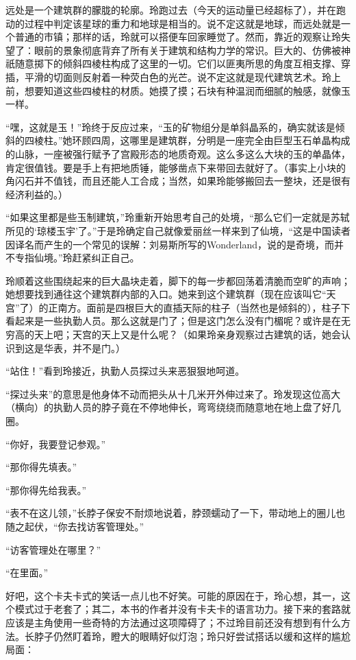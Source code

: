远处是一个建筑群的朦胧的轮廓。玲跑过去（今天的运动量已经超标了），并在跑动的过程中判定该星球的重力和地球是相当的。说不定这就是地球，而远处就是一个普通的市镇；那样的话，玲就可以搭便车回家睡觉了。然而，靠近的观察让玲失望了：眼前的景象彻底背弃了所有关于建筑和结构力学的常识。巨大的、仿佛被神祇随意掷下的倾斜四棱柱构成了这里的一切。它们以匪夷所思的角度互相支撑、穿插，平滑的切面则反射着一种荧白色的光芒。说不定这就是现代建筑艺术。玲上前，想要知道这些四棱柱的材质。她摸了摸；石块有种温润而细腻的触感，就像玉一样。

“嘿，这就是玉！”玲终于反应过来，“玉的矿物组分是单斜晶系的，确实就该是倾斜的四棱柱。”她环顾四周，这哪里是建筑群，分明是一座完全由巨型玉石单晶构成的山脉，一座被强行赋予了宫殿形态的地质奇观。这么多这么大块的玉的单晶体，肯定很值钱。要是手上有把地质锤，能够凿点下来带回去就好了。（事实上小块的角闪石并不值钱，而且还能人工合成；当然，如果玲能够搬回去一整块，还是很有经济利益的。）

“如果这里都是些玉制建筑，”玲重新开始思考自己的处境，“那么它们一定就是苏轼所见的‘琼楼玉宇’了。”于是玲确定自己就像爱丽丝一样来到了仙境，“这是中国读者因译名而产生的一个常见的误解：刘易斯所写的Wonderland，说的是奇境，而并不专指仙境。”玲赶紧纠正自己。

玲顺着这些围绕起来的巨大晶块走着，脚下的每一步都回荡着清脆而空旷的声响；她想要找到通往这个建筑群内部的入口。她来到这个建筑群（现在应该叫它“天宫”了）的正南方。面前是四根巨大的直插天际的柱子（当然也是倾斜的），柱子下看起来是一些执勤人员。那么这就是门了；但是这门怎么没有门楣呢？或许是在无穷高的天上吧；天宫的天上又是什么呢？（如果玲亲身观察过古建筑的话，她会认识到这是华表，并不是门。）

“站住！”看到玲接近，执勤人员探过头来恶狠狠地呵道。

“探过头来”的意思是他身体不动而把头从十几米开外伸过来了。玲发现这位高大（横向）的执勤人员的脖子竟在不停地伸长，弯弯绕绕而随意地在地上盘了好几圈。

“你好，我要登记参观。”

“那你得先填表。”

“那你得先给我表。”

“表不在这儿领，”长脖子保安不耐烦地说着，脖颈蠕动了一下，带动地上的圈儿也随之起伏，“你去找访客管理处。”

“访客管理处在哪里？”

“在里面。”

好吧，这个卡夫卡式的笑话一点儿也不好笑。可能的原因在于，玲心想，其一，这个模式过于老套了；其二，本书的作者并没有卡夫卡的语言功力。接下来的套路就应该是主角使用一些奇特的方法通过这项障碍了；不过玲目前还没有想到有什么方法。长脖子仍然盯着玲，瞪大的眼睛好似灯泡；玲只好尝试搭话以缓和这样的尴尬局面：


